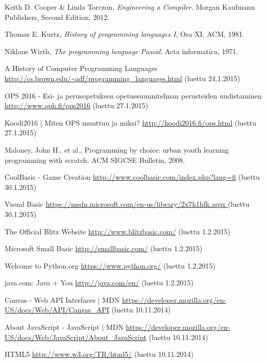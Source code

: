 
\begin{thebibliography}{99}

	Keith D. Cooper \& Linda Torczon,
	\emph{Engineering a Compiler}.
	Morgan Kaufmann Publishers,
	Second Edition,
	2012.

	Thomas E. Kurtz,
	\emph{History of programming languages I}, Osa XI.
	ACM,
	1981.

	Niklaus Wirth,
	\emph{The programming language Pascal}.
	Acta informatica,
	1971.
	
	A History of Computer Programming Languages \url{http://cs.brown.edu/~adf/programming_languages.html} (luettu 24.1.2015)
	
	OPS 2016 - Esi- ja perusopetuksen opetussuunnitelman perusteiden uudistaminen \url{http://www.oph.fi/ops2016} (luettu 27.1.2015)

	Koodi2016 | Miten OPS muuttuu ja miksi? \url{http://koodi2016.fi/ops.html} (luettu 27.1.2015)

	Maloney, John H., et al.,
	Programming by choice: urban youth learning programming with scratch.
	ACM SIGCSE Bulletin,
	2008.

	CoolBasic - Game Creation \url{http://www.coolbasic.com/index.php?lang=fi} (luettu 30.1.2015)
	
	Visual Basic \url{https://msdn.microsoft.com/en-us/library/2x7h1hfk.aspx
} (luettu 30.1.2015)

	The Official Blitz Website \url{http://www.blitzbasic.com/} (luettu 1.2.2015)

	Microsoft Small Basic \url{http://smallbasic.com/} (luettu 1.2.2015)

	Welcome to Python.org \url{https://www.python.org/} (luettu 1.2.2015)

	java.com: Java + You \url{http://java.com/en/} (luettu 1.2.2015)
	
	Canvas - Web API Interfaces | MDN \url{https://developer.mozilla.org/en-US/docs/Web/API/Canvas_API} (luettu 10.11.2014)

	About JavaScript - JavaScript | MDN \url{https://developer.mozilla.org/en-US/docs/Web/JavaScript/About_JavaScript} (luettu 10.11.2014)
	
	HTML5 \url{http://www.w3.org/TR/html5/} (luettu 10.11.2014)


\end{thebibliography}
